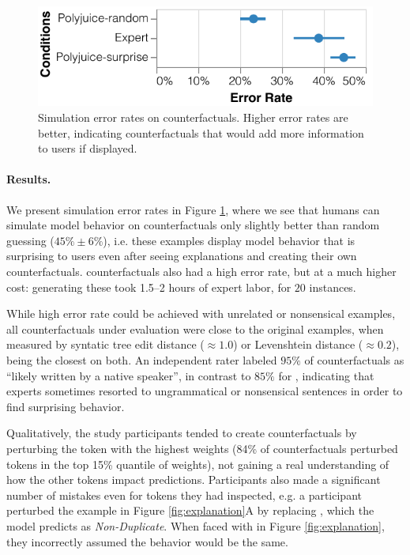 \begin{figure}[t]
\centering
\includegraphics[width=1\columnwidth]{figures/err_rate.pdf}
\vspace{-15pt}
\caption{
Simulation error rates on counterfactuals. Higher error rates are better, indicating counterfactuals that would add more information to users if displayed.
}
\vspace{-10pt}
\label{fig:err_rate}
\end{figure}

\paragraph{Results.}
We present simulation error rates in Figure \ref{fig:err_rate}, where we see that humans can simulate model behavior on \cshap counterfactuals only slightly better than random guessing ($45\%\pm6\%$), i.e. these examples display model behavior that is surprising to users even after seeing explanations and creating their own counterfactuals. \chuman counterfactuals also had a high error rate, but at a much higher cost: generating these took 1.5--2 hours of expert labor, for $20$ instances.

While high error rate could be achieved with unrelated or nonsensical examples, all counterfactuals under evaluation were close to the original examples, when measured by syntatic tree edit distance (${\approx}1.0$) or Levenshtein distance (${\approx}0.2$), \cshap being the closest on both. An independent rater labeled $95\%$ of \cshap counterfactuals as ``likely written by a native speaker'', in contrast to $85\%$ for \chuman, indicating that experts sometimes resorted to ungrammatical or nonsensical sentences in order to find surprising behavior.

Qualitatively, the study participants tended to create counterfactuals by perturbing the token with the highest weights (84\% of counterfactuals perturbed tokens in the top 15\% quantile of weights), not gaining a real understanding of how the other tokens impact predictions. Participants also made a significant number of mistakes even for tokens they had inspected, e.g. a participant perturbed the example in Figure \ref{fig:explanation}A by replacing , which the model predicts as \emph{Non-Duplicate}. When faced with  in Figure \ref{fig:explanation}, they incorrectly assumed the behavior would be the same.

